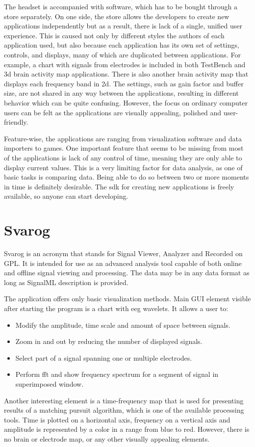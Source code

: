 The headset is accompanied with software, which has to be bought through a store
separately. On one side, the store allows the developers to create new
applications independently but as a result, there is lack of a single, unified
user experience. This is caused not only by different styles the authors of each
application used, but also because each application has its own set of
settings, controls, and displays, many of which are duplicated between
applications. For example, a chart with signals from electrodes is included in
both TestBench and \gls{3d} brain activity map applications. There is also another
brain activity map that displays each frequency band in \gls{2d}. The settings,
such as gain factor and buffer size, are not shared in any way between the
applications, resulting in different behavior which can be quite confusing.
However, the focus on ordinary computer users can be felt as the applications
are visually appealing, polished and user-friendly.

Feature-wise, the applications are ranging from visualization software and data
importers to games. One important feature that seems to be missing from most of
the applications is lack of any control of time, meaning they are only able to
display current values. This is a very limiting factor for data analysis, as one of
basic tasks is comparing data. Being able to do so between two or more
moments in time is definitely desirable. The \gls{sdk} for creating new applications
is freely available, so anyone can start developing.

\section{Svarog}
Svarog is an acronym that stands for Signal Viewer, Analyzer and Recorded on GPL. 
It is intended for use as an advanced analysis tool capable
of both online and offline signal viewing and processing. The data may be in any
data format as long as SignalML description is provided.

The application offers only basic visualization methods. Main GUI element
visible after starting the program is a chart with \gls{eeg} wavelets. It allows a user to:
\begin{itemize}
	\item Modify the amplitude, time scale and amount of space between signals.
	\item Zoom in and out by reducing the number of displayed signals. 
	\item Select part of a signal spanning one or multiple electrodes.
	\item Perform \gls{fft} and show frequency spectrum for a segment of signal in superimposed window.
\end{itemize}
Another interesting element is a time-frequency map that is
used for presenting results of a matching pursuit algorithm, which is one of the available
processing tools. Time is plotted on a horizontal axis, frequency on a vertical axis and
amplitude is represented by a color in a range from blue to red. However, there is
no brain or electrode map, or any other visually appealing elements.

